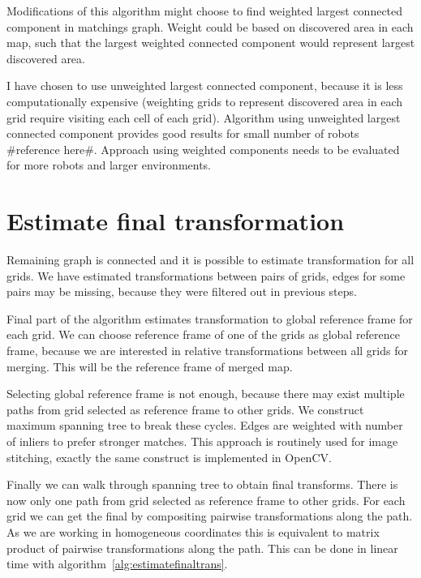 Modifications of this algorithm might choose to find weighted largest connected component in matchings graph. Weight could be based on discovered area in each map, such that the largest weighted connected component would represent largest discovered area.

I have chosen to use unweighted largest connected component, because it is less computationally expensive (weighting grids to represent discovered area in each grid require visiting each cell of each grid). Algorithm using unweighted largest connected component provides good results for small number of robots \#reference here\#. Approach using weighted components needs to be evaluated for more robots and larger environments.


\section{Estimate final transformation} %
\label{sec:estimate_final_transformation}

Remaining graph is connected and it is possible to estimate transformation for all grids. We have estimated transformations between pairs of grids, edges for some pairs may be missing, because they were filtered out in previous steps.

Final part of the algorithm estimates transformation to global reference frame for each grid. We can choose reference frame of one of the grids as global reference frame, because we are interested in relative transformations between all grids for merging. This will be the reference frame of merged map.

Selecting global reference frame is not enough, because there may exist multiple paths from grid selected as reference frame to other grids. We construct maximum spanning tree to break these cycles. Edges are weighted with number of inliers to prefer stronger matches. This approach is routinely used for image stitching, exactly the same construct is implemented in \gls{OpenCV}.

Finally we can walk through spanning tree to obtain final transforms. There is now only one path from grid selected as reference frame to other grids. For each grid we can get the final by compositing pairwise transformations along the path. As we are working in homogeneous coordinates this is equivalent to matrix product of pairwise transformations along the path. This can be done in linear time with algorithm~\ref{alg:estimatefinaltrans}.

